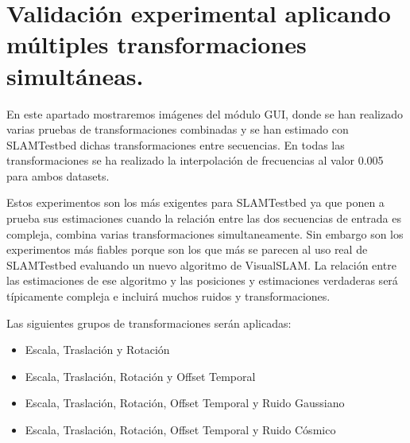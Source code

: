 \section{Validación experimental aplicando múltiples transformaciones simultáneas.}

En este apartado mostraremos imágenes del módulo GUI, donde se han realizado varias pruebas de transformaciones combinadas y se han estimado con SLAMTestbed dichas transformaciones entre secuencias.
En todas las transformaciones se ha realizado la interpolación de frecuencias al valor 0.005 para ambos datasets.

Estos experimentos son los más exigentes para SLAMTestbed ya que ponen a prueba sus estimaciones cuando la relación entre las dos secuencias de entrada es compleja, combina varias transformaciones simultaneamente. Sin embargo son los experimentos más fiables porque son los que más se parecen al uso real de SLAMTestbed evaluando un nuevo algoritmo de VisualSLAM. La relación entre las estimaciones de ese algoritmo y las posiciones y estimaciones verdaderas será típicamente compleja e incluirá muchos ruidos y transformaciones.

Las siguientes grupos de transformaciones serán aplicadas:
\begin{itemize}
	\item{Escala, Traslación y Rotación}
	\item{Escala, Traslación, Rotación y Offset Temporal}
	\item{Escala, Traslación, Rotación, Offset Temporal y Ruido Gaussiano}
	\item{Escala, Traslación, Rotación, Offset Temporal y Ruido Cósmico}
\end{itemize}

